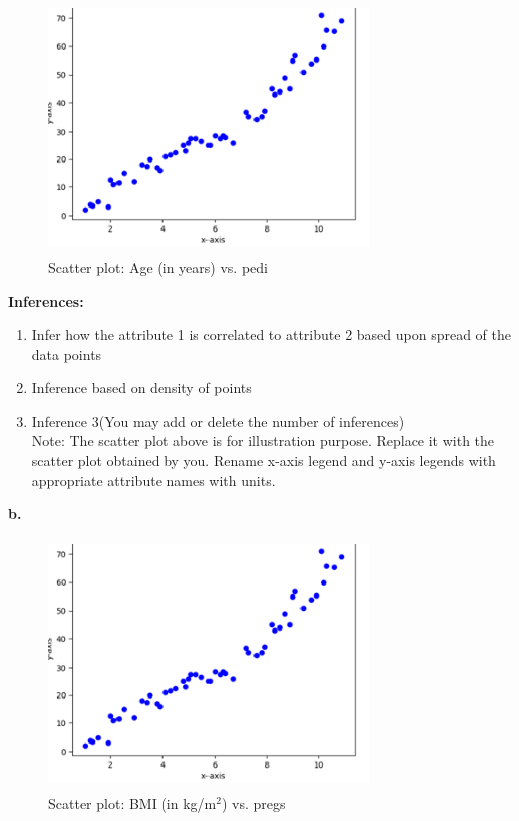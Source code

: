 \documentclass[12 pt, a4paper]{article}
\theoremstyle{definition}
\begin{document}
\begin{figure}[H]
	\centering
	\includegraphics[width=8.5cm,height=6.65cm]{Scatter Plot.png}
	\caption{Scatter plot: Age (in years) vs. pedi}
	\label{Blockdia}
\end{figure}

\textbf{\Large Inferences:}
\begin{enumerate}
   \item Infer how the attribute 1 is correlated to attribute 2 based upon spread of the data points
   \item Inference based on density of points
   \item Inference 3(You may add or delete the number of inferences)
\\Note: The scatter plot above is for illustration purpose. Replace it with the scatter plot obtained by you. Rename x-axis legend and y-axis legends with appropriate attribute names with units.

\end{enumerate}



\noindent\textbf{b.}
\begin{figure}[H]
	\centering
	\includegraphics[width=8.5cm,height=6.65cm]{Scatter Plot.png}
	\caption{Scatter plot: BMI (in kg/m$^{2 }$) vs. pregs}
	\label{Blockdia}
\end{figure}
\end{document}
